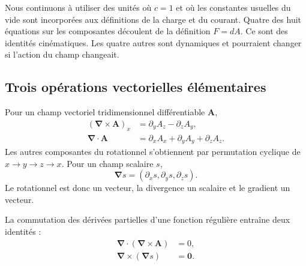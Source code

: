 Nous continuons à utiliser des unités où \(c=1\) et où les constantes usuelles du vide sont incorporées aux définitions de la charge et du courant. Quatre des huit équations sur les composantes découlent de la définition \(F=dA\). Ce sont des identités cinématiques. Les quatre autres sont dynamiques et pourraient changer si l’action du champ changeait.

\subsection{Trois opérations vectorielles élémentaires}

Pour un champ vectoriel tridimensionnel différentiable \(\mathbf A\),
\begin{align}
(\boldsymbol\nabla\times\mathbf A)_x
&=
\partial_yA_z-\partial_zA_y,
\\
\boldsymbol\nabla\cdot\mathbf A
&=
\partial_xA_x+\partial_yA_y+\partial_zA_z.
\end{align}
Les autres composantes du rotationnel s’obtiennent par permutation cyclique de \(x\to y\to z\to x\). Pour un champ scalaire \(s\),
\begin{equation}
\boldsymbol\nabla s
=
(\partial_xs,\partial_ys,\partial_zs).
\end{equation}
Le rotationnel est donc un vecteur, la divergence un scalaire et le gradient un vecteur.

\begin{classroomqa}
\end{classroomqa}

La commutation des dérivées partielles d’une fonction régulière entraîne deux identités :
\begin{align}
\boldsymbol\nabla\cdot
(\boldsymbol\nabla\times\mathbf A)
&=0,
\label{eq:div-curl}
\\
\boldsymbol\nabla\times
(\boldsymbol\nabla s)
&=\mathbf0.
\label{eq:curl-grad}
\end{align}

\begin{classroomqa}
\end{classroomqa}

